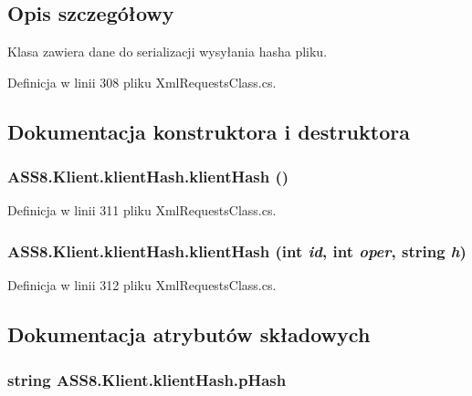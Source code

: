 \subsection{Opis szczegółowy}
Klasa zawiera dane do serializacji wysyłania hasha pliku. 



Definicja w linii 308 pliku XmlRequestsClass.cs.

\subsection{Dokumentacja konstruktora i destruktora}
\hypertarget{a00008_6c9be19f6d58c4e42d82c298f9cdb3e8}{
\subsubsection[{klientHash}]{\setlength{\rightskip}{0pt plus 5cm}ASS8.Klient.klientHash.klientHash ()}}
\label{d4/dee/a00008_6c9be19f6d58c4e42d82c298f9cdb3e8}




Definicja w linii 311 pliku XmlRequestsClass.cs.\hypertarget{a00008_41ce9f388ec0f731d80ebec886f7b4b2}{
\subsubsection[{klientHash}]{\setlength{\rightskip}{0pt plus 5cm}ASS8.Klient.klientHash.klientHash (int {\em id}, \/  int {\em oper}, \/  string {\em h})}}
\label{d4/dee/a00008_41ce9f388ec0f731d80ebec886f7b4b2}




Definicja w linii 312 pliku XmlRequestsClass.cs.

\subsection{Dokumentacja atrybutów składowych}
\hypertarget{a00008_0dba6fe0451b6d3b95cea1b021233229}{
\subsubsection[{pHash}]{\setlength{\rightskip}{0pt plus 5cm}string {\bf ASS8.Klient.klientHash.pHash}}}
\label{d4/dee/a00008_0dba6fe0451b6d3b95cea1b021233229}




